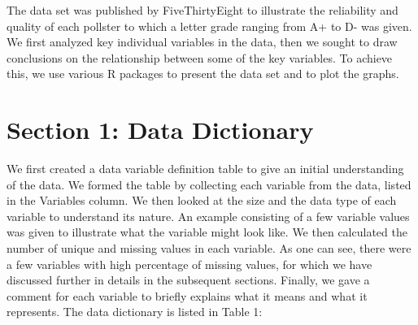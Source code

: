 \documentclass[
  12pt,
]{article}
\begin{document}
The data set was published by FiveThirtyEight to illustrate the
reliability and quality of each pollster to which a letter grade ranging
from A+ to D- was given. We first analyzed key individual variables in
the data, then we sought to draw conclusions on the relationship between
some of the key variables. To achieve this, we use various R packages to
present the data set and to plot the graphs.

\hypertarget{section-1-data-dictionary}{%
\section{Section 1: Data Dictionary}\label{section-1-data-dictionary}}

We first created a data variable definition table to give an initial
understanding of the data. We formed the table by collecting each
variable from the data, listed in the Variables column. We then looked
at the size and the data type of each variable to understand its nature.
An example consisting of a few variable values was given to illustrate
what the variable might look like. We then calculated the number of
unique and missing values in each variable. As one can see, there were a
few variables with high percentage of missing values, for which we have
discussed further in details in the subsequent sections. Finally, we
gave a comment for each variable to briefly explains what it means and
what it represents. The data dictionary is listed in Table 1:
\end{document}
